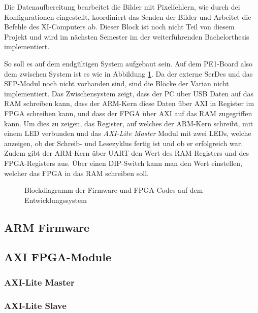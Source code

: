 \documentclass{article}
\begin{document}
Die Datenaufbereitung bearbeitet die Bilder mit Pixelfehlern, wie durch dei Konfigurationen eingestellt, koordiniert das Senden der Bilder und Arbeitet die Befehle des XI-Computers ab. Dieser Block ist noch nicht Teil von diesem Projekt und wird im nächsten Semester im der weiterführenden Bachelorthesis implementiert.

So soll es auf dem endgültigen System aufgebaut sein. Auf dem PE1-Board also dem zwischen System ist es wie in Abbildung \ref{fig:bd_firmware_pe1}. Da der externe SerDes und das SFP-Modul noch nicht vorhanden sind, sind die Blöcke der Varian nicht implementiert. Das Zwischensystem zeigt, dass der PC über USB Daten auf das RAM schreiben kann, dass der ARM-Kern diese Daten über AXI in Register im FPGA schreiben kann, und dass der FPGA über AXI auf das RAM zugegriffen kann. Um dies zu zeigen, das Register, auf welches der ARM-Kern schreibt, mit einem LED verbunden und das \textit{AXI-Lite Master} Modul mit zwei LEDs, welche anzeigen, ob der Schreib- und Lesezyklus fertig ist und ob er erfolgreich war. Zudem gibt der ARM-Kern über UART den Wert des RAM-Registers und des FPGA-Registers aus. Über einen DIP-Switch kann man den Wert einstellen, welcher das FPGA in das RAM schreiben soll. 


\begin{figure}[tb]
    \caption{Blockdiagramm der Firmware und FPGA-Codes auf dem Entwicklungssystem}
    \label{fig:bd_firmware_pe1}
\end{figure}


\subsection{ARM Firmware}

\subsection{AXI FPGA-Module}
\subsubsection*{AXI-Lite Master}
\subsubsection*{AXI-Lite Slave}
\end{document}
